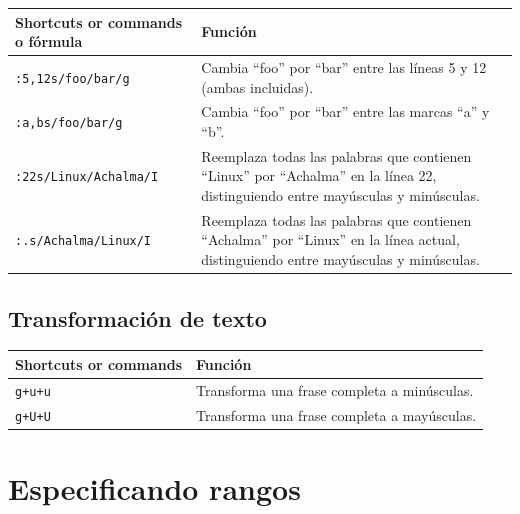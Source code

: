 \documentclass[
  doc,
  floatsintext,
  longtable,
  a4paper,
  nolmodern,
  notxfonts,
  notimes,
  12pt,
  colorlinks=true,linkcolor=blue,citecolor=blue,urlcolor=blue]{apa7}
\newcounter{none} %
\begin{document}
{\def\LTcaptype{none} %
\begin{longtable}[]{@{}
  >{\raggedright\arraybackslash}p{}
  >{\raggedright\arraybackslash}p{}@{}}
\toprule\noalign{}
\begin{minipage}[b]{\linewidth}\raggedright
Shortcuts or commands o fórmula
\end{minipage} & \begin{minipage}[b]{\linewidth}\raggedright
Función
\end{minipage} \\
\midrule\noalign{}
\endhead
\bottomrule\noalign{}
\endlastfoot
\texttt{:5,12s/foo/bar/g} & Cambia ``foo'' por ``bar'' entre las líneas
5 y 12 (ambas incluidas). \\
\texttt{:\textquotesingle{}a,\textquotesingle{}bs/foo/bar/g} & Cambia
``foo'' por ``bar'' entre las marcas ``a'' y ``b''. \\
\texttt{:22s/Linux/Achalma/I} & Reemplaza todas las palabras que
contienen ``Linux'' por ``Achalma'' en la línea 22, distinguiendo entre
mayúsculas y minúsculas. \\
\texttt{:.s/Achalma/Linux/I} & Reemplaza todas las palabras que
contienen ``Achalma'' por ``Linux'' en la línea actual, distinguiendo
entre mayúsculas y minúsculas. \\
\end{longtable}
}

\subsection{Transformación de texto}\label{transformaciuxf3n-de-texto}

{\def\LTcaptype{none} %
\begin{longtable}[]{@{}ll@{}}
\toprule\noalign{}
Shortcuts or commands & Función \\
\midrule\noalign{}
\endhead
\bottomrule\noalign{}
\endlastfoot
\texttt{g+u+u} & Transforma una frase completa a minúsculas. \\
\texttt{g+U+U} & Transforma una frase completa a mayúsculas. \\
\end{longtable}
}

\section{Especificando rangos}\label{especificando-rangos}
\end{document}
